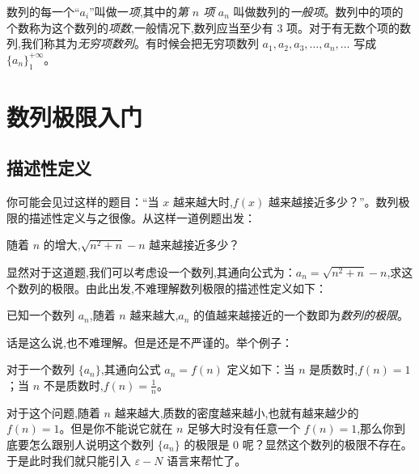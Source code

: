 \documentclass[lang=cn,10pt,twoside]{elegantbook}
\begin{document}
数列的每一个“$a_i$”叫做一\emph{项},其中的\emph{第 $n$ 项} $a_n$ 叫做数列的\emph{一般项}。数列中的项的个数称为这个数列的\emph{项数},一般情况下,数列应当至少有 $3$ 项。对于有无数个项的数列,我们称其为\emph{无穷项数列}。有时候会把无穷项数列 $a_1, a_2, a_3, \dots, a_n, \dots$ 写成 \emph{$\{a_n\}_1^{+\infty}$}。


\section{数列极限入门}
\subsection{描述性定义}
你可能会见过这样的题目：“当 $x$ 越来越大时,$f(x)$ 越来越接近多少？”。数列极限的描述性定义与之很像。从这样一道例题出发：

\begin{problem}
  随着 $n$ 的增大,$\sqrt{n^2+n}-n$ 越来越接近多少？
\end{problem}

显然对于这道题,我们可以考虑设一个数列,其通向公式为：$a_n = \sqrt{n^2+n}-n$,求这个数列的极限。由此出发,不难理解数列极限的描述性定义如下：

\begin{definition}[数列极限的描述性定义]
  已知一个数列 $a_n$,随着 $n$ 越来越大,$a_n$ 的值越来越接近的一个数即为\emph{数列的极限}。
\end{definition}

话是这么说,也不难理解。但是还是不严谨的。举个例子：

\begin{problem}
  对于一个数列 $\{a_n\}$,其通向公式 $a_n = f(n)$ 定义如下：当 $n$ 是质数时,$f(n)=1$；当 $n$ 不是质数时,$f(n)=\frac{1}{n}$。
\end{problem}

对于这个问题,随着 $n$ 越来越大,质数的密度越来越小,也就有越来越少的 $f(n)=1$。但是你不能说它就在 $n$ 足够大时没有任意一个 $f(n)=1$,那么你到底要怎么跟别人说明这个数列 $\{a_n\}$ 的极限是 $0$ 呢？显然这个数列的极限不存在。于是此时我们就只能引入 $\varepsilon-N$ 语言来帮忙了。

\newpage
\end{document}
